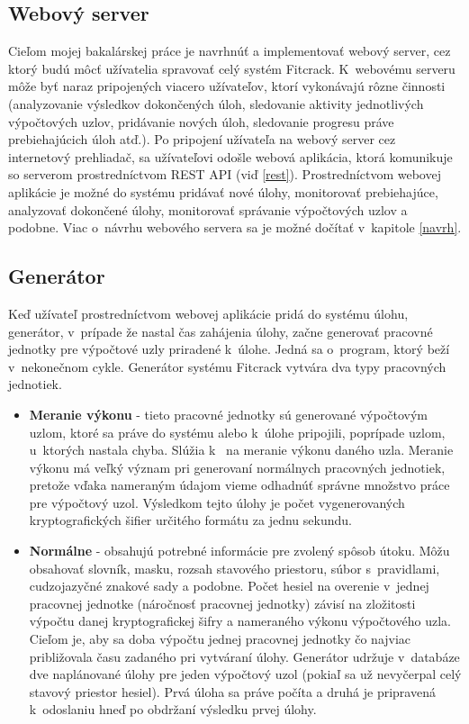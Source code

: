 \documentclass[slovak]{fitthesis}
\begin{document}
\subsection{Webový server}
Cieľom mojej bakalárskej práce je navrhnúť a implementovať webový server, cez ktorý budú môcť užívatelia spravovať celý systém Fitcrack. K~webovému serveru môže byť naraz pripojených viacero užívateľov, ktorí vykonávajú rôzne činnosti (analyzovanie výsledkov dokončených úloh, sledovanie aktivity jednotlivých výpočtových uzlov, pridávanie nových úloh, sledovanie progresu práve prebiehajúcich úloh atď.). Po pripojení užívateľa na webový server cez internetový prehliadač, sa užívateľovi odošle webová aplikácia, ktorá komunikuje so serverom prostredníctvom REST API (viď \ref{rest}). Prostredníctvom webovej aplikácie je možné do systému pridávať nové úlohy, monitorovať prebiehajúce, analyzovať dokončené úlohy, monitorovať správanie výpočtových uzlov a podobne. Viac o~návrhu webového servera sa je možné dočítať v~kapitole \ref{navrh}.

\subsection{Generátor}
Keď užívateľ prostredníctvom webovej aplikácie pridá do systému úlohu, generátor, v~prípade že nastal čas zahájenia úlohy, začne generovať pracovné jednotky pre výpočtové uzly priradené k~úlohe. Jedná sa o~program, ktorý beží v~nekonečnom cykle. Generátor systému Fitcrack vytvára dva typy pracovných jednotiek.
\begin{itemize}
    \item \textbf{Meranie výkonu} - tieto pracovné jednotky sú generované výpočtovým uzlom, ktoré sa práve do systému alebo k~úlohe pripojili, poprípade uzlom, u~ktorých nastala chyba. Slúžia k~ na meranie výkonu daného uzla. Meranie výkonu má veľký význam pri generovaní normálnych pracovných jednotiek, pretože vďaka nameraným údajom vieme odhadnúť správne množstvo práce pre výpočtový uzol. Výsledkom tejto úlohy je počet vygenerovaných kryptografických šifier určitého formátu za jednu sekundu. 
    \item \textbf{Normálne} - obsahujú potrebné informácie pre zvolený spôsob útoku. Môžu obsahovať slovník, masku, rozsah stavového priestoru, súbor s~pravidlami, cudzojazyčné znakové sady a podobne. Počet hesiel na overenie v~jednej pracovnej jednotke (náročnosť pracovnej jednotky) závisí na zložitosti výpočtu danej kryptografickej šifry a nameraného výkonu výpočtového uzla. Cieľom je, aby sa doba výpočtu jednej pracovnej jednotky čo najviac približovala času zadaného pri vytváraní úlohy. Generátor udržuje v~databáze dve naplánované úlohy pre jeden výpočtový uzol (pokiaľ sa už nevyčerpal celý stavový priestor hesiel). Prvá úloha sa práve počíta a druhá je pripravená k~odoslaniu hneď po obdržaní výsledku prvej úlohy.
\end{itemize}
\end{document}
